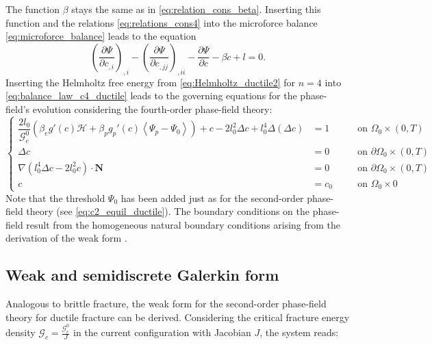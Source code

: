 The function $\beta$ stays the same as in \eqref{eq:relation_cons_beta}. Inserting this function and the relations \eqref{eq:relations_cons4} into the microforce balance \eqref{eq:microforce_balance} leads to the equation
\begin{equation} \label{eq:balance_law_c4_ductile}
	\left(\dfrac{\partial\Psi}{\partial c_{,i}}\right)_{,i}-\left(\dfrac{\partial\Psi}{\partial c_{,jj}}\right)_{,ii}-\dfrac{\partial\Psi}{\partial c}-\beta\dot{c}+l=0.
\end{equation}
Inserting the Helmholtz free energy from \eqref{eq:Helmholtz_ductile2} for $n=4$ into \eqref{eq:balance_law_c4_ductile} leads to the governing equations for the phase-field's evolution considering the fourth-order phase-field theory:
\begin{equation} \label{eq:c4_equil_ductile}
	\left\{\begin{alignedat}{2}
		\dfrac{2l_{0}}{\mathcal{G}_{c}^{0}}\left(\beta_{e}g'\left(c\right)\mathcal{H}+\beta_{p}g_{p}'\left(c\right)\left<\Psi_{p}-\Psi_{0}\right>\right) + c - 2l_{0}^{2}\Delta c +l_{0}^{4}\Delta\left(\Delta c\right) &= 1 && \quad\text{on } \Omega_{0}\times\left(0,T\right) \\
		\Delta c &= 0 && \quad \text{on } \partial\Omega_{0}\times\left(0,T\right) \\
		\nabla\left(l_{0}^{4}\Delta c-2l_{0}^{2}c\right)\cdot\mathbf{N} &= 0 && \quad \text{on } \partial\Omega_{0}\times\left(0,T\right) \\
c &= c_{0} && \quad \text{on } \Omega_{0}\times0  
	\end{alignedat}\right.
\end{equation}
Note that the threshold $\Psi_{0}$ has been added just as for the second-order phase-field theory (see \eqref{eq:c2_equil_ductile}). The boundary conditions on the phase-field result from the homogeneous natural boundary conditions arising from the derivation of the weak form \citep{11_PF_DissBorden}.

\subsection{Weak and semidiscrete Galerkin form}
Analogous to brittle fracture, the weak form for the second-order phase-field theory for ductile fracture can be derived. Considering the critical fracture energy density $\mathcal{G}_{c}=\frac{\mathcal{G}_{c}^{0}}{J}$ in the current configuration with Jacobian $J$, the system reads:

